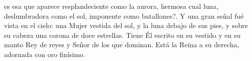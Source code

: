 es esa que aparece resplandeciente como la aurora, hermosa cual luna, deslumbradora como el sol, imponente como batallones?.
Y una gran señal fué vista en el cielo: una Mujer vestida del sol, y la luna debajo de sus  pies, y sobre su cabeza una corona de doce estrellas.
Tiene Él escrito en su vestido y en su manto Rey de reyes y Señor de los que dominan. Está la Reina a su derecha, adornada con oro finísimo. 